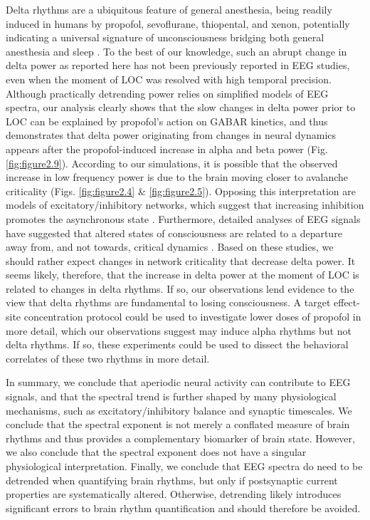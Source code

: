 Delta rhythms are a ubiquitous feature of general anesthesia, being readily induced in humans by propofol, sevoflurane, thiopental, and xenon\cite{Purdon2013, Gugino2001, Huupponen2008, Johnson2003, Lewis2012, Ma2006, Murphy2011}, potentially indicating a universal signature of unconsciousness bridging both general anesthesia and sleep \cite{Amzica1998, LeMasson2002, Steriade2000}. To the best of our knowledge, such an abrupt change in delta power as reported here has not been previously reported in EEG studies, even when the moment of LOC was resolved with high temporal precision\cite{Purdon2013}. Although practically detrending power relies on simplified models of EEG spectra, our analysis clearly shows that the slow changes in delta power prior to LOC can be explained by propofol’s action on GABAR kinetics, and thus demonstrates that delta power originating from changes in neural dynamics appears after the propofol-induced increase in alpha and beta power (Fig. \ref{fig:figure2.9}). According to our simulations, it is possible that the observed increase in low frequency power is due to the brain moving closer to avalanche criticality (Figs. \ref{fig:figure2.4} \& \ref{fig:figure2.5}). Opposing this interpretation are models of excitatory/inhibitory networks, which suggest that increasing inhibition promotes the asynchronous state \cite{Li2020}. Furthermore, detailed analyses of EEG signals have suggested that altered states of consciousness are related to a departure away from, and not towards, critical dynamics \cite{Tagliazucchi2016, Toker2022}. Based on these studies, we should rather expect changes in network criticality that decrease delta power. It seems likely, therefore, that the increase in delta power at the moment of LOC is related to changes in delta rhythms. If so, our observations lend evidence to the view that delta rhythms are fundamental to losing consciousness. A target effect-site concentration protocol could be used to investigate lower doses of propofol in more detail, which our observations suggest may induce alpha rhythms but not delta rhythms. If so, these experiments could be used to dissect the behavioral correlates of these two rhythms in more detail.

In summary, we conclude that aperiodic neural activity can contribute to EEG signals, and that the spectral trend is further shaped by many physiological mechanisms, such as excitatory/inhibitory balance and synaptic timescales. We conclude that the spectral exponent is not merely a conflated measure of brain rhythms and thus provides a complementary biomarker of brain state. However, we also conclude that the spectral exponent does not have a singular physiological interpretation. Finally, we conclude that EEG spectra do need to be detrended when quantifying brain rhythms, but only if postsynaptic current properties are systematically altered. Otherwise, detrending likely introduces significant errors to brain rhythm quantification and should therefore be avoided.


